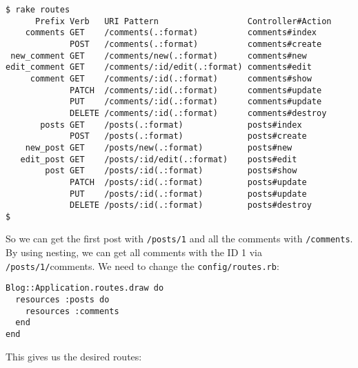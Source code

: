 \documentclass[a4paper]{book}
\begin{document}
\begin{shaded}\begin{verbatim}
$ rake routes
      Prefix Verb   URI Pattern                  Controller#Action
    comments GET    /comments(.:format)          comments#index
             POST   /comments(.:format)          comments#create
 new_comment GET    /comments/new(.:format)      comments#new
edit_comment GET    /comments/:id/edit(.:format) comments#edit
     comment GET    /comments/:id(.:format)      comments#show
             PATCH  /comments/:id(.:format)      comments#update
             PUT    /comments/:id(.:format)      comments#update
             DELETE /comments/:id(.:format)      comments#destroy
       posts GET    /posts(.:format)             posts#index
             POST   /posts(.:format)             posts#create
    new_post GET    /posts/new(.:format)         posts#new
   edit_post GET    /posts/:id/edit(.:format)    posts#edit
        post GET    /posts/:id(.:format)         posts#show
             PATCH  /posts/:id(.:format)         posts#update
             PUT    /posts/:id(.:format)         posts#update
             DELETE /posts/:id(.:format)         posts#destroy
$
\end{verbatim}\end{shaded}

So we can get the first post with \texttt{/posts/1} and all the comments with \texttt{/comments}. By using nesting, we can get all comments with the ID 1 via \texttt{/posts/1/}comments. We need to change the \texttt{config/routes.rb}:

\begin{shaded}\begin{verbatim}
Blog::Application.routes.draw do
  resources :posts do
    resources :comments
  end
end
\end{verbatim}\end{shaded}

This gives us the desired routes:
\end{document}
